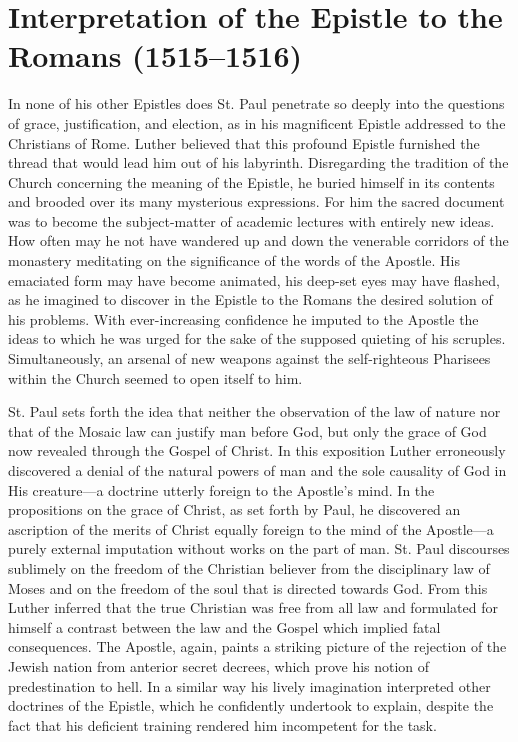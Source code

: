 \section{Interpretation of the Epistle to the Romans (1515--1516)}

In none of his other Epistles does St. Paul penetrate so deeply into
the questions of grace, justification, and election, as in his magnificent
Epistle addressed to the Christians of Rome. Luther believed
that this profound Epistle furnished the thread that would lead him
out of his labyrinth. Disregarding the tradition of the Church concerning
the meaning of the Epistle, he buried himself in its contents
and brooded over its many mysterious expressions. For him the
sacred document was to become the subject-matter of academic
lectures with entirely new ideas. How often may he not have
wandered up and down the venerable corridors of the monastery
meditating on the significance of the words of the Apostle. His
emaciated form may have become animated, his deep-set eyes may
have flashed, as he imagined to discover in the Epistle to the Romans
the desired solution of his problems. With ever-increasing confidence
he imputed to the Apostle the ideas to which he was urged for the
sake of the supposed quieting of his scruples. Simultaneously, an
arsenal of new weapons against the self-righteous Pharisees within
the Church seemed to open itself to him.

St. Paul sets forth the idea that neither the observation of the law
of nature nor that of the Mosaic law can justify man before God,
but only the grace of God now revealed through the Gospel of
Christ. In this exposition Luther erroneously discovered a denial
of the natural powers of man and the sole causality of God in His
creature—a doctrine utterly foreign to the Apostle’s mind. In the
propositions on the grace of Christ, as set forth by Paul, he discovered
an ascription of the merits of Christ equally foreign to the
mind of the Apostle—a purely external imputation without works
on the part of man. St. Paul discourses sublimely on the freedom of
the Christian believer from the disciplinary law of Moses and on the
freedom of the soul that is directed towards God. From this Luther
inferred that the true Christian was free from all law and formulated
for himself a contrast between the law and the Gospel which implied
fatal consequences. The Apostle, again, paints a striking picture of
the rejection of the Jewish nation from anterior secret decrees, which
prove his notion of predestination to hell. In a similar way his lively
imagination interpreted other doctrines of the Epistle, which he
confidently undertook to explain, despite the fact that his deficient
training rendered him incompetent for the task.


